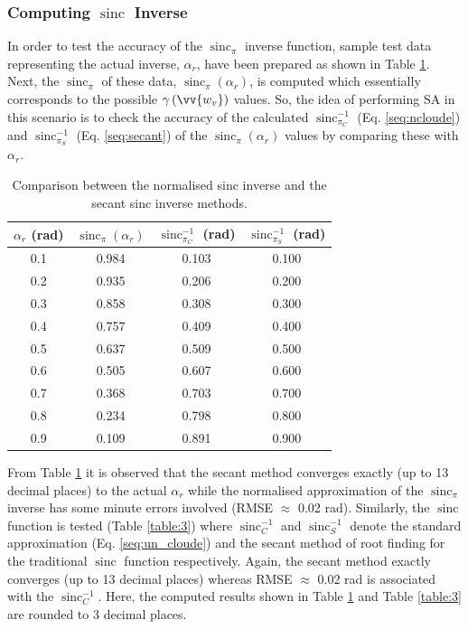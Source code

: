 \documentclass[review]{elsarticle}
\numberwithin{equation}{section}
\numberwithin{figure}{section}
\numberwithin{table}{section}
\DeclareMathOperator{\sinc}{sinc}
\begin{document}
\subsubsection*{Computing $\sinc$ Inverse}
In order to test the accuracy of the $\sinc_\pi$ inverse function, sample test data representing the actual inverse, $\alpha_r$, have been prepared as shown in Table \ref{table:2}. Next, the $\sinc_\pi$ of these data, $\sinc_{\pi}\left(\alpha_r\right)$, is computed which essentially corresponds to the possible $\gamma\left(\vv{w_v}\right)$ values. So, the idea of performing SA in this scenario is to check the accuracy of the calculated $\sinc_{\pi_C}^{-1}$ (Eq. \eqref{seq:ncloude}) and $\sinc_{\pi_S}^{-1}$ (Eq. \eqref{seq:secant}) of the $\sinc_{\pi}\left(\alpha_r\right)$ values by comparing these with $\alpha_r$.

\begin{table}[ht]
\centering
\caption{Comparison between the normalised \cite{Cloude2010} sinc inverse and the secant sinc inverse methods.}
\label{table:2}
\begin{tabular}{c c c c}
\hline
\boldmath$\alpha_r$ \textbf{(rad)} & \boldmath$\sinc_{\pi}\left(\alpha_r\right)$   & \boldmath$\sinc_{\pi_C}^{-1}$ \textbf{(rad)}     & \boldmath$\sinc_{\pi_S}^{-1}$ \textbf{(rad)} \\ \hline
0.1                 & 0.984            & 0.103          & 0.100  \\ 
0.2                 & 0.935            & 0.206          & 0.200  \\ 
0.3                 & 0.858            & 0.308          & 0.300  \\ 
0.4                 & 0.757            & 0.409          & 0.400  \\ 
0.5                 & 0.637            & 0.509          & 0.500   \\ 
0.6                 & 0.505            & 0.607          & 0.600  \\ 
0.7                 & 0.368            & 0.703          & 0.700   \\ 
0.8                 & 0.234            & 0.798          & 0.800 \\ 
0.9                 & 0.109            & 0.891          & 0.900 \\ \hline

\end{tabular}
\end{table}

From Table \ref{table:2} it is observed that the secant method converges exactly (up to 13 decimal places) to the
actual $\alpha_r$ while the normalised \cite{Cloude2010} approximation of the $\sinc_\pi$ inverse has some minute errors
involved (RMSE $\approx$ 0.02 rad). Similarly, the $\sinc$ function is tested (Table \ref{table:3}) where $\sinc_C^{-1}$ and $\sinc_S^{-1}$ denote the standard \cite{Cloude2010} approximation (Eq. \eqref{seq:un_cloude}) and the secant method of root finding for the traditional $\sinc$ function respectively. Again, the secant method exactly converges (up to 13 decimal
places) whereas RMSE $\approx$ 0.02 rad is associated with the $\sinc_C^{-1}$. Here, the computed results shown in
Table \ref{table:2} and Table \ref{table:3} are rounded to 3 decimal places.
\end{document}
